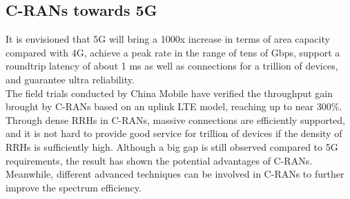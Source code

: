 \documentclass{article}
\begin{document}


\subsection{C-RANs towards 5G}\nocite{peng16}


It is envisioned that 5G will bring a 1000x increase in terms 
of area capacity compared with 4G, achieve a peak rate in
the range of tens of Gbps, support a roundtrip latency of
about 1 ms as well as connections for a trillion of devices,
and guarantee ultra reliability.\\

The field trials conducted by China Mobile have verified the
throughput gain brought by C-RANs based on an uplink LTE model,
reaching up to near 300\%. Through dense RRHs in C-RANs,
massive connections are efficiently supported, and it is not
hard to provide good service for trillion of devices if the
density of RRHs is sufficiently high. Although a big gap
is still observed compared to 5G requirements, the result
has shown the potential advantages of C-RANs. Meanwhile,
different advanced techniques can be involved in C-RANs to
further improve the spectrum efficiency.


\printbibliography[heading=subbibliography]
\end{document}

